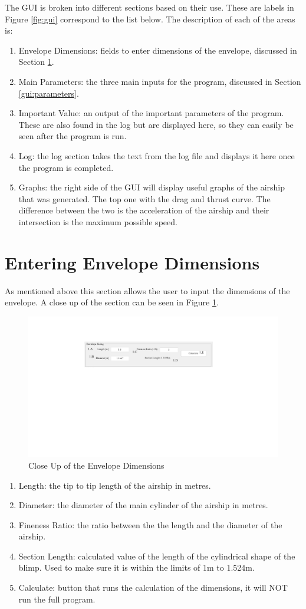 \documentclass[../main.tex]{subfiles}
\begin{document}
The GUI is broken into different sections based on their use. These are labels in Figure \ref{fig:gui} correspond to the list below. The description of each of the areas is:

\begin{enumerate}
	\item Envelope Dimensions: fields to enter dimensions of the envelope, discussed in Section \ref{gui:envelope}.
	\item Main Parameters: the three main inputs for the program, discussed in Section \ref{gui:parameters}.
	\item Important Value: an output of the important parameters of the program. These are also found in the log but are displayed here, so they can easily be seen after the program is run.
	\item Log: the log section takes the text from the log file and displays it here once the program is completed.
	\item Graphs: the right side of the GUI will display useful graphs of the airship that was generated. The top one with the drag and thrust curve. The difference between the two is the acceleration of the airship and their intersection is the maximum possible speed.
\end{enumerate}

\section{Entering Envelope Dimensions} \label{gui:envelope}
As mentioned above this section allows the user to input the dimensions of the envelope. A close up of the section can be seen in Figure \ref{fig:gui1}.

\begin{figure}[H]
	\centering
	\includegraphics[width=0.7\linewidth]{img/gui/guiSection1.pdf}
	\caption{Close Up of the Envelope Dimensions}
	\label{fig:gui1}
\end{figure}
\begin{enumerate}[	A]
	\item Length: the tip to tip length of the airship in metres.
	\item Diameter: the diameter of the main cylinder of the airship in metres.
	\item Fineness Ratio: the ratio between the the length and the diameter of the airship.
	\item Section Length: calculated value of the length of the cylindrical shape of the blimp. Used to make sure it is within the limits of 1m to 1.524m.
	\item Calculate: button that runs the calculation of the dimensions, it will NOT run the full program.
\end{enumerate}
\end{document}
